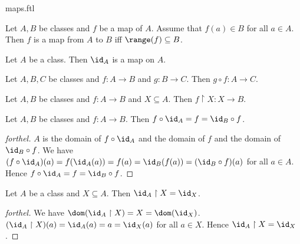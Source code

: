 \documentclass{naproche-library}
\begin{document}
\begin{smodule}{maps.ftl}
  \begin{proposition}
    Let $A, B$ be classes and $f$ be a map of $A$.
    Assume that $f(a) \in B$ for all $a \in A$.
    Then $f$ is a map from $A$ to $B$ iff $\range(f) \subseteq B$.
  \end{proposition}

  \begin{proposition}[forthel,id=FOUNDATIONS_06_5104361690628096,printid]
    Let $A$ be a class.
    Then $\id_{A}$ is a map on $A$.
  \end{proposition}

  \begin{proposition}[forthel,id=FOUNDATIONS_06_1706446651654144,printid]
    Let $A, B, C$ be classes and $f : A \to B$ and $g : B \to C$.
    Then $g \circ f : A \to C$.
  \end{proposition}

  \begin{proposition}[forthel,id=FOUNDATIONS_06_4078561256275968,printid]
    Let $A, B$ be classes and $f : A \to B$ and $X \subseteq A$.
    Then $f \restriction X : X \to B$.
  \end{proposition}

  \begin{proposition}[forthel,id=FOUNDATIONS_06_3964401904254976,printid]
    Let $A, B$ be classes and $f : A \to B$.
    Then $f \circ \id_{A} = f = \id_{B} \circ f$.
  \end{proposition}
  \begin{proof}[forthel]
    $A$ is the domain of $f \circ \id_{A}$ and the domain of $f$ and the domain of $\id_{B} \circ f$.
    We have $(f \circ \id_{A})(a)
      = f(\id_{A}(a))
      = f(a)
      = \id_{B}(f(a))
      = (\id_{B} \circ f)(a)$
    for all $a \in A$.
    Hence $f \circ \id_{A}
      = f
      = \id_{B} \circ f$.
  \end{proof}

  \begin{proposition}[forthel,id=FOUNDATIONS_06_3118771061391360,printid]
    Let $A$ be a class and $X \subseteq A$.
    Then $\id_{A} \restriction X = \id_{X}$.
  \end{proposition}
  \begin{proof}[forthel]
    We have $\dom(\id_{A} \restriction X)
      = X
      = \dom(\id_{X})$.
    $(\id_{A} \restriction X)(a)
      = \id_{A}(a)
      = a
      = \id_{X}(a)$
    for all $a \in X$.
    Hence $\id_{A} \restriction X = \id_{X}$.
  \end{proof}


\end{smodule}
\end{document}
